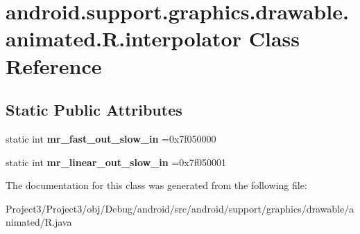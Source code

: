 \hypertarget{classandroid_1_1support_1_1graphics_1_1drawable_1_1animated_1_1R_1_1interpolator}{}\section{android.\+support.\+graphics.\+drawable.\+animated.\+R.\+interpolator Class Reference}
\label{classandroid_1_1support_1_1graphics_1_1drawable_1_1animated_1_1R_1_1interpolator}
\subsection*{Static Public Attributes}
\begin{DoxyCompactItemize}
\item 
\mbox{\label{classandroid_1_1support_1_1graphics_1_1drawable_1_1animated_1_1R_1_1interpolator_a110bff87d2cc4a316bd6d9fd31885392}} 
static int {\bfseries mr\+\_\+fast\+\_\+out\+\_\+slow\+\_\+in} =0x7f050000
\item 
\mbox{\label{classandroid_1_1support_1_1graphics_1_1drawable_1_1animated_1_1R_1_1interpolator_a1f3ec8e3ffb3ff44a1d2bd4ea00c74a5}} 
static int {\bfseries mr\+\_\+linear\+\_\+out\+\_\+slow\+\_\+in} =0x7f050001
\end{DoxyCompactItemize}


The documentation for this class was generated from the following file\+:\begin{DoxyCompactItemize}
\item 
Project3/\+Project3/obj/\+Debug/android/src/android/support/graphics/drawable/animated/R.\+java\end{DoxyCompactItemize}
